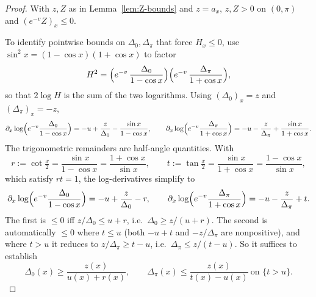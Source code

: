 \documentclass{amsart}
\begin{document}
\begin{proof}
With $z, Z$ as in Lemma~\ref{lem:Z-bounds} and $z=a_x$,
$z,Z>0$ on $(0,\pi)$ and $(e^{-v}Z)_x\leq 0$.

To identify pointwise bounds on $\Delta_0,\Delta_\pi$ that force $H_x\leq 0$, use
$\sin^2 x=(1-\cos x)(1+\cos x)$ to factor
\[
H^2=\Bigl(e^{-v}\,\frac{\Delta_0}{1-\cos x}\Bigr)\Bigl(e^{-v}\,\frac{\Delta_\pi}{1+\cos x}\Bigr),
\]
so that $2\log H$ is the sum of the two logarithms. Using $(\Delta_0)_x=z$
and $(\Delta_\pi)_x=-z$,
\[
\partial_x\log\Bigl(e^{-v}\frac{\Delta_0}{1-\cos x}\Bigr)=-u+\frac z{\Delta_0}-\frac{\sin x}{1-\cos x},\qquad
\partial_x\log\Bigl(e^{-v}\frac{\Delta_\pi}{1+\cos x}\Bigr)=-u-\frac z{\Delta_\pi}+\frac{\sin x}{1+\cos x}.
\]
The trigonometric remainders are half-angle quantities. With
\begin{equation}\label{eq:rt-def}
r:=\cot\tfrac x2=\frac{\sin x}{1-\cos x}=\frac{1+\cos x}{\sin x},\qquad
t:=\tan\tfrac x2=\frac{\sin x}{1+\cos x}=\frac{1-\cos x}{\sin x},
\end{equation}
which satisfy $rt=1$, the log-derivatives simplify to
\[
\partial_x\log\Bigl(e^{-v}\frac{\Delta_0}{1-\cos x}\Bigr)=-u+\frac{z}{\Delta_0}-r,\qquad
\partial_x\log\Bigl(e^{-v}\frac{\Delta_\pi}{1+\cos x}\Bigr)=-u-\frac{z}{\Delta_\pi}+t.
\]
The first is $\leq 0$ iff $z/\Delta_0\leq u+r$, i.e.\ $\Delta_0\geq z/(u+r)$.
The second is automatically $\leq 0$ where $t\leq u$ (both $-u+t$ and
$-z/\Delta_\pi$ are nonpositive), and where $t>u$ it reduces to
$z/\Delta_\pi\geq t-u$, i.e.\ $\Delta_\pi\leq z/(t-u)$. So it suffices to establish
\begin{equation}\label{eq:a-pm-bounds}
\Delta_0(x)\geq\frac{z(x)}{u(x)+r(x)},\qquad
\Delta_\pi(x)\leq\frac{z(x)}{t(x)-u(x)}\ \text{on $\{t>u\}$.}
\end{equation}


\end{proof}
\end{document}
